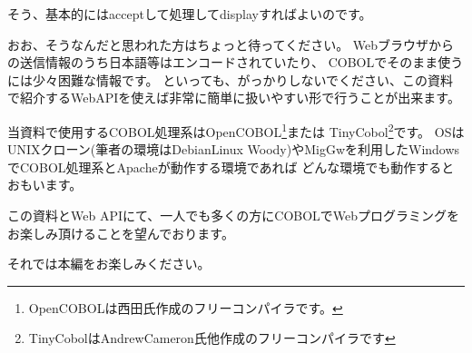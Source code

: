 \par

そう、基本的にはacceptして処理してdisplayすればよいのです。

おお、そうなんだと思われた方はちょっと待ってください。
Webブラウザからの送信情報のうち日本語等はエンコードされていたり、
COBOLでそのまま使うには少々困難な情報です。
といっても、がっかりしないでください、この資料で紹介するWebAPIを使えば非常に簡単に扱いやすい形で行うことが出来ます。

当資料で使用するCOBOL処理系はOpenCOBOL\footnote{OpenCOBOLは西田氏作成のフリーコンパイラです。}または TinyCobol\footnote{TinyCobolはAndrewCameron氏他作成のフリーコンパイラです}です。
OSはUNIXクローン(筆者の環境はDebianLinux Woody)やMigGwを利用したWindowsでCOBOL処理系とApacheが動作する環境であれば
どんな環境でも動作するとおもいます。

この資料とWeb APIにて、一人でも多くの方にCOBOLでWebプログラミングをお楽しみ頂けることを望んでおります。

それでは本編をお楽しみください。








